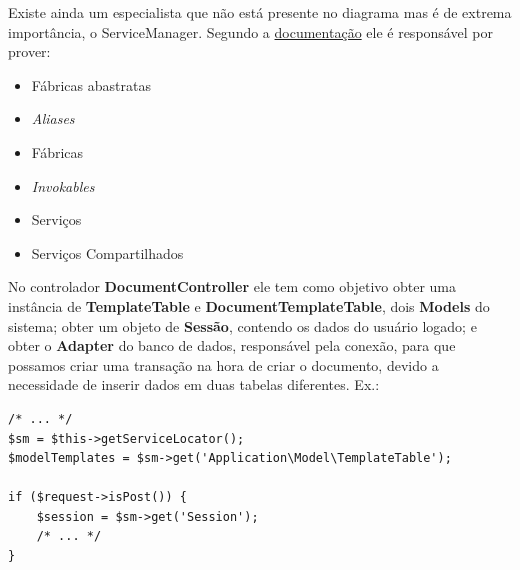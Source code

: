 Existe ainda um especialista que não está presente no diagrama mas é de
extrema importância, o ServiceManager. Segundo a
\href{http://framework.zend.com/manual/2.0/en/modules/zend.service-manager.quick-start.html}{documentação}
ele é responsável por prover:

\begin{itemize}
\item
  Fábricas abastratas
\item
  \emph{Aliases}
\item
  Fábricas
\item
  \emph{Invokables}
\item
  Serviços
\item
  Serviços Compartilhados
\end{itemize}
No controlador \textbf{DocumentController} ele tem como objetivo obter
uma instância de \textbf{TemplateTable} e
\textbf{DocumentTemplateTable}, dois \textbf{Models} do sistema; obter
um objeto de \textbf{Sessão}, contendo os dados do usuário logado; e
obter o \textbf{Adapter} do banco de dados, responsável pela conexão,
para que possamos criar uma transação na hora de criar o documento,
devido a necessidade de inserir dados em duas tabelas diferentes. Ex.:

\begin{verbatim}
/* ... */
$sm = $this->getServiceLocator();
$modelTemplates = $sm->get('Application\Model\TemplateTable');

if ($request->isPost()) {
    $session = $sm->get('Session');
    /* ... */
}
\end{verbatim}

